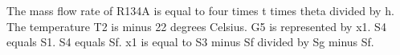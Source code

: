 The mass flow rate of R134A is equal to four times t times theta divided by h. The temperature T2 is minus 22 degrees Celsius. G5 is represented by x1. S4 equals S1. S4 equals Sf. x1 is equal to S3 minus Sf divided by Sg minus Sf.